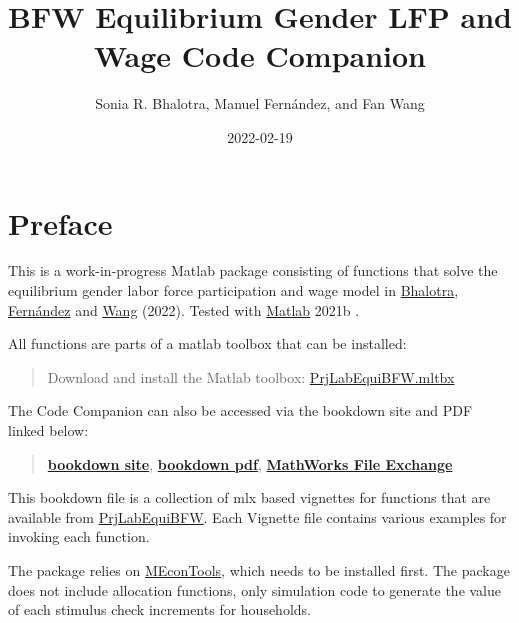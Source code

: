 \documentclass[
]{book}
\title{BFW Equilibrium Gender LFP and Wage Code Companion}
\author{Sonia R. Bhalotra, Manuel Fernández, and Fan Wang}
\date{2022-02-19}
\begin{document}
\maketitle

{
\hypersetup{linkcolor=}
\setcounter{tocdepth}{1}
\tableofcontents
}
\hypertarget{preface}{%
\chapter*{Preface}\label{preface}}

This is a work-in-progress Matlab package consisting of functions that solve the equilibrium gender labor force participation and wage model in \href{https://www.iza.org/person/2905/sonia-r-bhalotra}{Bhalotra}, \href{https://sites.google.com/view/manuelfernandezsierra}{Fernández} and \href{https://fanwangecon.github.io/}{Wang} (2022). Tested with \href{https://www.mathworks.com/products/matlab.html}{Matlab} 2021b \citep{matlab}.

All functions are parts of a matlab toolbox that can be installed:

\begin{quote}
Download and install the Matlab toolbox: \href{https://github.com/FanWangEcon/PrjLabEquiBFW/blob/main/PrjLabEquiBFW.mltbx}{PrjLabEquiBFW.mltbx}
\end{quote}

The Code Companion can also be accessed via the bookdown site and PDF linked below:

\begin{quote}
\href{https://fanwangecon.github.io/PrjLabEquiBFW/bookdown/}{\textbf{bookdown site}}, \href{https://fanwangecon.github.io/PrjLabEquiBFW/bookdown/BFW-Equilibrium-Gender-LFP-and-Wage-Code-Companion.pdf}{\textbf{bookdown pdf}}, \href{https://www.mathworks.com/matlabcentral/fileexchange/80164-PrjLabEquiBFW}{\textbf{MathWorks File Exchange}}
\end{quote}

This bookdown file is a collection of mlx based vignettes for functions that are available from \href{https://github.com/FanWangEcon/PrjLabEquiBFW}{PrjLabEquiBFW}. Each Vignette file contains various examples for invoking each function.

The package relies on \href{https://fanwangecon.github.io/MEconTools/}{MEconTools}, which needs to be installed first. The package does not include allocation functions, only simulation code to generate the value of each stimulus check increments for households.
\end{document}
